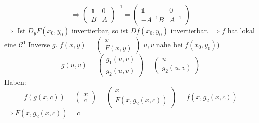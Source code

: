 \documentclass[../ana2.tex]{subfiles}
\begin{document}
\[ \Rightarrow \begin{pmatrix}
    \mathds{1} & 0 \\
    B & A
\end{pmatrix}^{-1} = \begin{pmatrix}
    \mathds{1} & 0 \\
    -A^{-1}B & A^{-1}
\end{pmatrix} \]
\(\Rightarrow\) Ist \(D_yF(x_0, y_0)\) invertierbar, 
so ist \( Df (x_0, y_0) \) invertierbar.
\(\Rightarrow f\) hat lokal eine \(\mathcal{C}^1\) Inverse \(g\).
\(f(x,y) =\begin{pmatrix}
    x \\
    F(x,y)
\end{pmatrix}\)
\(u,v\) nahe bei \(f(x_0,y_0)\))\\
\[ g(u,v) = \begin{pmatrix}
    g_1(u,v) \\ g_2(u,v)
\end{pmatrix} = \begin{pmatrix}
    u \\
    g_2(u,v)
\end{pmatrix} \]
Haben: 
\[f(g(x,c)) = \begin{pmatrix}
    x \\
    c
\end{pmatrix} = \begin{pmatrix}
    x \\
    F(x, g_2(x, c))
\end{pmatrix} = f(x,g_2(x,c)) \]
\( \Rightarrow F(x,g_2(x,c)) = c \)
\end{document}
